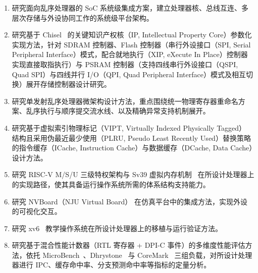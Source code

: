\begin{enumerate}
  \item 研究面向乱序处理器的 SoC 系统级集成方案，建立处理器核、总线互连、多层次存储与外设协同工作的系统级平台架构。
  \item 研究基于 Chisel~\cite{bachrach2012chisel} 的关键知识产权核（IP, Intellectual Property Core）参数化实现方法，针对 SDRAM 控制器、Flash 控制器（串行外设接口（SPI, Serial Peripheral Interface）模式，配合就地执行（XIP, eXecute In Place）控制器实现直接取指执行）与 PSRAM 控制器（支持四线串行外设接口（QSPI, Quad SPI）与四线并行 I/O（QPI, Quad Peripheral Interface）模式及相互切换）展开存储控制器设计研究。
  \item 研究单发射乱序处理器微架构设计方法，重点围绕统一物理寄存器重命名方案、乱序执行与顺序提交流水线、以及精确异常支持机制展开。
  \item 研究基于虚拟索引物理标记（VIPT, Virtually Indexed Physically Tagged）\cite{cekleov1997vipt} 结构且采用伪最近最少使用（PLRU, Pseudo Least Recently Used）替换策略的指令缓存（ICache, Instruction Cache）与数据缓存（DCache, Data Cache）设计方法。
  \item 研究 RISC-V M/S/U 三级特权架构与 Sv39 虚拟内存机制~\cite{riscv2024priv} 在所设计处理器上的实现路径，使其具备运行操作系统所需的体系结构支持能力。
  \item 研究 NVBoard（NJU Virtual Board）\cite{nvboard2024} 在仿真平台中的集成方法，实现外设的可视化交互。
  \item 研究 xv6~\cite{cox2024xv6} 教学操作系统在所设计处理器上的移植与运行验证方法。
  \item 研究基于混合性能计数器（RTL 寄存器 + DPI-C 事件）的多维度性能评估方法，依托 MicroBench~\cite{microbench2024}、Dhrystone~\cite{weicker1984dhrystone} 与 CoreMark~\cite{coremark2009} 三组负载，对所设计处理器进行 IPC、缓存命中率、分支预测命中率等指标的定量分析。
\end{enumerate}
